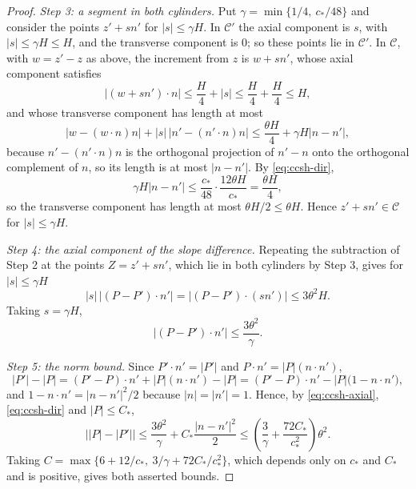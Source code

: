 \begin{proof}
\emph{Step 3: a segment in both cylinders.}
Put $\gamma=\min\{1/4,\ c_*/48\}$ and consider the points $z'+sn'$ for
$|s|\le\gamma H$. In $\mathcal C'$ the axial component is $s$, with
$|s|\le\gamma H\le H$, and the transverse component is $0$; so these points lie
in $\mathcal C'$. In $\mathcal C$, with $w=z'-z$ as above, the increment from
$z$ is $w+sn'$, whose axial component satisfies
\[
  |(w+sn')\cdot n|\le\frac H4+|s|\le\frac H4+\frac H4\le H,
\]
and whose transverse component has length at most
\[
  \bigl|w-(w\cdot n)n\bigr|+|s|\,\bigl|n'-(n'\cdot n)n\bigr|
  \le\frac{\theta H}4+\gamma H|n-n'| ,
\]
because $n'-(n'\cdot n)n$ is the orthogonal projection of $n'-n$ onto the
orthogonal complement of $n$, so its length is at most $|n-n'|$. By
\eqref{eq:ccsh-dir},
\[
  \gamma H|n-n'|\le\frac{c_*}{48}\cdot\frac{12\theta H}{c_*}
    =\frac{\theta H}4 ,
\]
so the transverse component has length at most $\theta H/2\le\theta H$. Hence
$z'+sn'\in\mathcal C$ for $|s|\le\gamma H$.

\emph{Step 4: the axial component of the slope difference.}
Repeating the subtraction of Step 2 at the points $Z=z'+sn'$, which lie in both
cylinders by Step 3, gives for $|s|\le\gamma H$
\[
  |s|\,\bigl|(P-P')\cdot n'\bigr|=\bigl|(P-P')\cdot(sn')\bigr|\le3\theta^2H .
\]
Taking $s=\gamma H$,
\begin{equation}\label{eq:ccsh-axial}
  \bigl|(P-P')\cdot n'\bigr|\le\frac{3\theta^2}{\gamma}.
\end{equation}

\emph{Step 5: the norm bound.}
Since $P'\cdot n'=|P'|$ and $P\cdot n'=|P|(n\cdot n')$,
\[
  |P'|-|P|=(P'-P)\cdot n'+|P|(n\cdot n')-|P|
    =(P'-P)\cdot n'-|P|\bigl(1-n\cdot n'\bigr),
\]
and $1-n\cdot n'=|n-n'|^2/2$ because $|n|=|n'|=1$. Hence, by
\eqref{eq:ccsh-axial}, \eqref{eq:ccsh-dir} and $|P|\le C_*$,
\[
  \bigl||P|-|P'|\bigr|
   \le\frac{3\theta^2}{\gamma}+C_*\frac{|n-n'|^2}2
   \le\left(\frac3\gamma+\frac{72C_*}{c_*^2}\right)\theta^2 .
\]
Taking $C=\max\{6+12/c_*,\ 3/\gamma+72C_*/c_*^2\}$, which depends only on $c_*$
and $C_*$ and is positive, gives both asserted bounds.
\end{proof}
